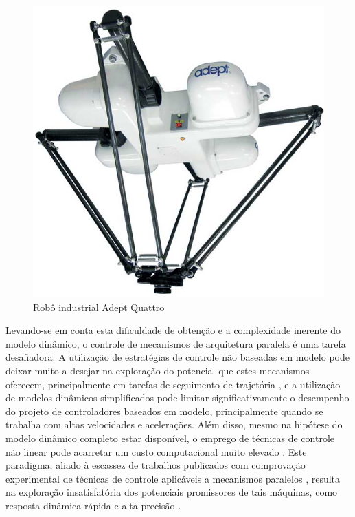 \documentclass[]{politex}
\begin{document}
\begin{figure}[h]
	\centering
	\includegraphics[scale=0.17]{../figures/theadeptquat.jpg}  
	\caption{Robô industrial Adept Quattro}
	\label{fig:Mecanismo}
\end{figure}

Levando-se em conta esta dificuldade de obtenção e a complexidade inerente do modelo dinâmico, o controle de mecanismos de arquitetura paralela é uma tarefa desafiadora. A utilização de estratégias de controle não baseadas em modelo pode deixar muito a desejar na exploração do potencial que estes mecanismos oferecem, principalmente em tarefas de seguimento de trajetória \cite{Chung}, e a utilização de modelos dinâmicos simplificados pode limitar significativamente o desempenho do projeto de controladores baseados em modelo, principalmente quando se trabalha com altas velocidades e acelerações. Além disso, mesmo na hipótese do modelo dinâmico completo estar disponível, o emprego de técnicas de controle não linear pode acarretar um custo  computacional muito elevado \cite{Craig, Slotini, Zubizarreta, Zubizarreta3}. Este paradigma, aliado à escassez de trabalhos publicados com comprovação experimental de técnicas de controle aplicáveis a mecanismos paralelos \cite{Rynaldo}, resulta na exploração insatisfatória dos potenciais promissores de tais máquinas, como resposta dinâmica rápida e alta precisão \cite{Abdellatif}.
	
\end{document}

